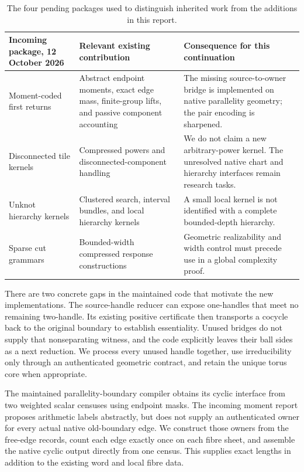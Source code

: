 \begin{table}[htbp]
\centering\small
\begin{tabularx}{\linewidth}{@{}P{.23\linewidth}YY@{}}
\toprule
Incoming package, 12 October 2026 & Relevant existing contribution &
Consequence for this continuation\\
\midrule
Moment-coded first returns & Abstract endpoint moments, exact edge mass,
finite-group lifts, and passive component accounting & The missing
source-to-owner bridge is implemented on native parallelity geometry;
the pair encoding is sharpened.\\
Disconnected tile kernels & Compressed powers and disconnected-component
handling & We do not claim a new arbitrary-power kernel.  The unresolved
native chart and hierarchy interfaces remain research tasks.\\
Unknot hierarchy kernels & Clustered search, interval bundles, and local
hierarchy kernels & A small local kernel is not identified with a complete
bounded-depth hierarchy.\\
Sparse cut grammars & Bounded-width compressed response constructions &
Geometric realizability and width control must precede use in a global
complexity proof.\\
\bottomrule
\end{tabularx}
\caption{The four pending packages used to distinguish inherited work from
the additions in this report.}
\label{tab:incoming-audit}
\end{table}

There are two concrete gaps in the maintained code that motivate the new
implementations.  The source-handle reducer can expose one-handles that
meet no remaining two-handle.  Its existing positive certificate then
transports a cocycle back to the original boundary to establish essentiality.
Unused bridges do not supply that nonseparating witness, and the code
explicitly leaves their ball sides as a next reduction.  We process every
unused handle together, use irreducibility only through an authenticated
geometric contract, and retain the unique torus core when appropriate.

The maintained parallelity-boundary compiler obtains its cyclic interface
from two weighted scalar censuses using endpoint masks.  The incoming
moment report proposes arithmetic labels abstractly, but does not supply
an authenticated owner for every actual native old-boundary edge.  We
construct those owners from the free-edge records, count each edge exactly
once on each fibre sheet, and assemble the native cyclic output directly
from one census.  This supplies exact lengths in addition to the existing
word and local fibre data.

